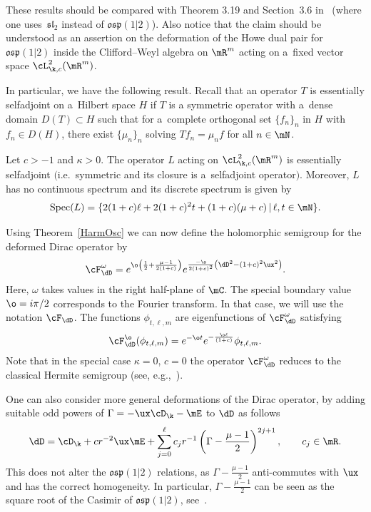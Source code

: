 These results should be compared with Theorem 3.19 and Section~3.6 in~\cite{Orsted2} (where one
uses~$\mathfrak{sl}_{2}$ instead of $\mathfrak{osp}(1|2)$).
Also notice that the claim should be understood as an assertion on the deformation of the Howe dual
pair for $\mathfrak{osp}(1|2)$ inside the Clif\/ford--Weyl algebra on $\mR^{m}$ acting on a~f\/ixed vector
space $\cL^{2}_{\k,c}(\mR^{m})$.

In particular, we have the following result.
Recall that an operator $T$ is essentially selfadjoint on a~Hilbert space $H$ if $T$ is a
symmetric operator with a~dense domain $D(T)\subset H$ such that for a~complete orthogonal set
$\{f_n\}_n$ in $H$ with $f_n\in D(H)$, there exist $\{\mu_n\}_n$ solving $Tf_n=\mu_nf$ for all
$n\in\mN$.
\begin{proposition}
Let $c>-1$ and $\kappa>0$.
The operator $L$ acting on
$\cL^{2}_{\k,c}(\mR^{m})$ is essentially selfadjoint $($i.e.\
symmetric and its closure is a~selfadjoint operator$)$.
Moreover, $L$ has no continuous spectrum and its
discrete spectrum is given by
\begin{gather*}
\operatorname{Spec}(L)=\{2(1+c)\ell+2(1+c)^{2}t+(1+c)(\mu+c)\,|\,\ell,t\in\mN\}.
\end{gather*}
\end{proposition}

Using Theorem~\ref{HarmOsc} we can now def\/ine the holomorphic semigroup for the deformed Dirac
operator by
\begin{gather*}
\cF_{\dD}^{\omega}=e^{\o\left(\frac{1}{2}+\frac{\mu-1}{2(1+c)}\right)}e^{\frac{-\o}{
2(1+c)^{2}}\left(\dD^{2}-(1+c)^{2}\ux^{2}\right)}.
\end{gather*}
Here, $\omega$ takes values in the right half-plane of $\mC$.
The special boundary value $\o=i\pi/2$ corresponds to the Fourier transform.
In that case, we will use the notation $\cF_{\dD}$.
The functions $\phi_{t,\ell,m}$ are eigenfunctions of $\cF_{\dD}^{\omega}$ satisfying
\begin{gather}
\label{eigvalsFourier}
\cF_{\dD}^{\o}(\phi_{t,\ell,m})=e^{-\o t}e^{-\frac{\o\ell}{(1+c)}}\phi_{t,\ell,m}.
\end{gather}
Note that in the special case $\kappa=0$, $c=0$ the operator $\cF_{\dD}^{\omega}$ reduces to the
classical Hermite semigroup (see, e.g.,~\cite{MR0974332}).

\begin{remark}
One can also consider more general deformations of the Dirac operator, by adding suitable odd
powers of $\Gamma=-\ux\cD_{\k}-\mE$ to $\dD$ as follows
\begin{gather*}
\dD=\cD_{\k}+c r^{-2}\ux\mE+\sum_{j=0}^{\ell}c_{j}r^{-1}\left(\Gamma-\frac{\mu-1}{2}
\right)^{2j+1},\qquad c_{j}\in\mR.
\end{gather*}
This does not alter the $\mathfrak{osp}(1|2)$ relations, as $\Gamma-\frac{\mu-1}{2}$
anti-commutes with $\ux$ and has the correct homogeneity.
In particular, $\Gamma-\frac{\mu-1}{2}$ can be seen as the square root of the Casimir of
$\mathfrak{osp}(1|2)$, see~\cite[Example~2 in Section~2.5]{MR1773773}.
\end{remark}

